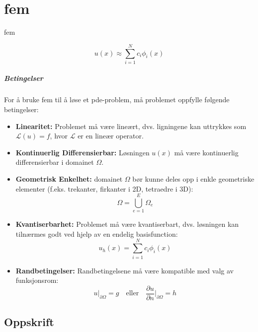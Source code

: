 \chapter{\gls{fem}}
\glsdesc{fem}

\begin{equation}
  u(x) \approx \sum_{i=1}^N c_i \phi_i(x)
\end{equation}

\paragraph{Betingelser}

For å bruke \gls{fem} til å løse et \gls{pde}-problem, må problemet oppfylle følgende betingelser:

\begin{itemize}
  \item \textbf{Linearitet:} Problemet må være lineært, dvs. ligningene kan uttrykkes som \(\mathcal{L}(u) = f\), hvor \(\mathcal{L}\) er en lineær operator.
  \item \textbf{Kontinuerlig Differensierbar:} Løsningen \( u(x) \) må være kontinuerlig differensierbar i \gls{domain}et \( \Omega \).
  \item \textbf{Geometrisk Enkelhet:} \gls{domain}et \( \Omega \) bør kunne deles opp i enkle geometriske elementer (f.eks. trekanter, firkanter i 2D, tetraedre i 3D):
        \[
          \Omega = \bigcup_{e=1}^{E} \Omega_e
        \]
  \item \textbf{Kvantiserbarhet:} Problemet må være kvantiserbart, dvs. løsningen kan tilnærmes godt ved hjelp av en endelig \gls{basisfunction}:
        \[
          u_h(x) = \sum_{i=1}^{N} c_i \phi_i(x)
        \]
  \item \textbf{Randbetingelser:} Randbetingelsene må være kompatible med valg av funksjonsrom:
        \[
          u|_{\partial \Omega} = g \quad \text{eller} \quad \frac{\partial u}{\partial n}\bigg|_{\partial \Omega} = h
        \]
\end{itemize}

\section{Oppskrift}

